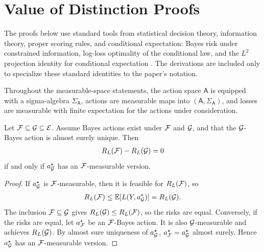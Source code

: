 \section{Value of Distinction Proofs}
\label{app:value-proofs}

The proofs below use standard tools from statistical decision theory, information theory, proper scoring rules, and conditional expectation: Bayes risk under constrained information, log-loss optimality of the conditional law, and the $L^2$ projection identity for conditional expectation \citep{blackwell1953equivalent,berger1985statistical,cover2006elements,gneiting2007strictly,billingsley1995probability,kallenberg2002foundations}. The derivations are included only to specialize these standard identities to the paper's notation.

Throughout the measurable-space statements, the action space $\mathsf A$ is equipped with a sigma-algebra $\Sigma_{\mathsf A}$, actions are measurable maps into $(\mathsf A,\Sigma_{\mathsf A})$, and losses are measurable with finite expectation for the actions under consideration.

\begin{theorem}
\label{thm:loss-relevant-refinement:formal}
Let $\mathcal{F}\subseteq\mathcal{G}\subseteq\mathcal{E}$. Assume Bayes actions exist under $\mathcal{F}$ and $\mathcal{G}$, and that the $\mathcal{G}$-Bayes action is almost surely unique. Then
\begin{align*}
R_L(\mathcal{F})-R_L(\mathcal{G})=0
\end{align*}
if and only if $a_{\mathcal{G}}^\star$ has an $\mathcal{F}$-measurable version.
\end{theorem}
\begin{proof}
If $a_{\mathcal{G}}^\star$ is $\mathcal{F}$-measurable, then it is feasible for $R_L(\mathcal{F})$, so
\begin{align*}
R_L(\mathcal{F})\le\operatorname*{\mathbb{E}}[L(Y,a_{\mathcal{G}}^\star)]=R_L(\mathcal{G}).
\end{align*}
The inclusion $\mathcal{F}\subseteq\mathcal{G}$ gives $R_L(\mathcal{G})\le R_L(\mathcal{F})$, so the risks are equal. Conversely, if the risks are equal, let $a_{\mathcal{F}}^\star$ be an $\mathcal{F}$-Bayes action. It is also $\mathcal{G}$-measurable and achieves $R_L(\mathcal{G})$. By almost sure uniqueness of $a_{\mathcal{G}}^\star$, $a_{\mathcal{F}}^\star=a_{\mathcal{G}}^\star$ almost surely. Hence $a_{\mathcal{G}}^\star$ has an $\mathcal{F}$-measurable version.
\end{proof}

